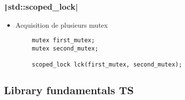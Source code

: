 \documentclass[C++.tex]{subfiles}
\begin{document}
\begin{frame}[fragile]
	\frametitle{\texttt|std::scoped_lock|}
	\begin{itemize}
		\item Acquisition de plusieurs mutex
	\end{itemize}

	\begin{verbatim}
		mutex first_mutex;
		mutex second_mutex;

		scoped_lock lck(first_mutex, second_mutex);
	\end{verbatim}

\end{frame}

\subsection*{Library fundamentals TS}
\end{document}
